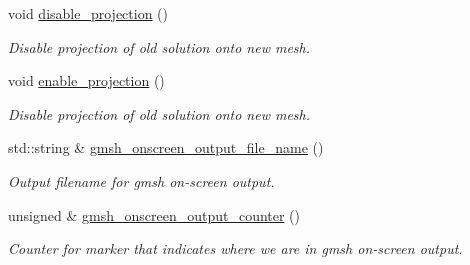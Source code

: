 \begin{DoxyCompactItemize}
void \hyperlink{classoomph_1_1GmshParameters_ad9c1ebc0ae01551b7899364a1cf25f19}{disable\+\_\+projection} ()
\begin{DoxyCompactList}\small\item\em Disable projection of old solution onto new mesh. \end{DoxyCompactList}\item 
void \hyperlink{classoomph_1_1GmshParameters_afa3a44a5a06632733efa49912a272865}{enable\+\_\+projection} ()
\begin{DoxyCompactList}\small\item\em Disable projection of old solution onto new mesh. \end{DoxyCompactList}\item 
std\+::string \& \hyperlink{classoomph_1_1GmshParameters_ac712c282aec129e50646e6cf07a7a92e}{gmsh\+\_\+onscreen\+\_\+output\+\_\+file\+\_\+name} ()
\begin{DoxyCompactList}\small\item\em Output filename for gmsh on-\/screen output. \end{DoxyCompactList}\item 
unsigned \& \hyperlink{classoomph_1_1GmshParameters_afde31eadaa2ca1862837624f68ea8d34}{gmsh\+\_\+onscreen\+\_\+output\+\_\+counter} ()
\begin{DoxyCompactList}\small\item\em Counter for marker that indicates where we are in gmsh on-\/screen output. \end{DoxyCompactList}\end{DoxyCompactItemize}
